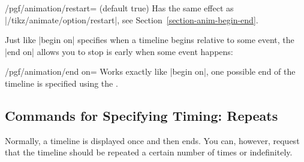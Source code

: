 \begin{key}{/pgf/animation/restart= (default true)}
    Has the same effect as |/tikz/animate/option/restart|, see
    Section~\ref{section-anim-begin-end}.
\end{key}

Just like |begin on| specifies when a timeline begins relative to some event,
the |end on| allows you to stop is early when some event happens:

\begin{key}{/pgf/animation/end on=}
    Works exactly like |begin on|, one possible end of the timeline is
    specified using the .
\end{key}


\subsection{Commands for Specifying Timing: Repeats}

Normally, a timeline is displayed once and then ends. You can, however, request
that the timeline should be repeated a certain number of times or indefinitely.

